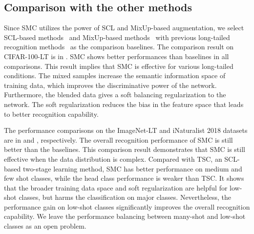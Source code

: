 \documentclass[10pt,twocolumn,letterpaper]{article}
\begin{document}
\subsection{Comparison with the other methods}
Since SMC utilizes the power of SCL and MixUp-based augmentation, we select SCL-based methods~\cite{KCL, TSC, BCL} and MixUp-based methods~\cite{chou2020remix, TSC} with previous long-tailed recognition methods~\cite{kang2019decoupling, cui2019class, lin2017focal, cao2019learning} as the comparison baselines.
The comparison result on CIFAR-100-LT is in .
SMC shows better performances than baselines in all comparisons.
This result implies that SMC is effective for various long-tailed conditions.
The mixed samples increase the semantic information space of training data, which improves the discriminative power of the network. Furthermore, the blended data gives a soft balancing regularization to the network. The soft regularization reduces the bias in the feature space that leads to better recognition capability.

The performance comparisons on the ImageNet-LT and iNaturalist 2018 datasets are in  and , respectively.
The overall recognition performance of SMC is still better than the baselines.
This comparison result demonstrates that SMC is still effective when the data distribution is complex.
Compared with TSC, an SCL-based two-stage learning method, SMC has better performance on medium and few shot classes, while the head class performance is weaker than TSC.
It shows that the broader training data space and soft regularization are helpful for low-shot classes, but harms the classification on major classes. Nevertheless, the performance gain on low-shot classes significantly improves the overall recognition capability. We leave the performance balancing between many-shot and low-shot classes as an open problem.
\end{document}
